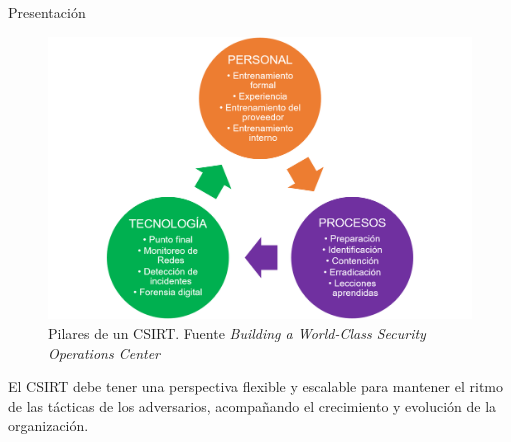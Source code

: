 \begin{section}{Presentación}
        \begin{figure}[H]
            \centering
            \includegraphics[width=1\textwidth]{./marco_teorico_imagenes/figura_1_pilares.png}
            \caption{Pilares de un CSIRT. Fuente \textit{Building a World-Class Security Operations Center} \cite{sans_2}}
            \label{fig:pilares}
        \end{figure}
        \FloatBarrier
        El CSIRT debe tener una perspectiva flexible y escalable para mantener el ritmo de las tácticas de los adversarios, acompañando el crecimiento y evolución de la organización. \par
    \end{section}
    
